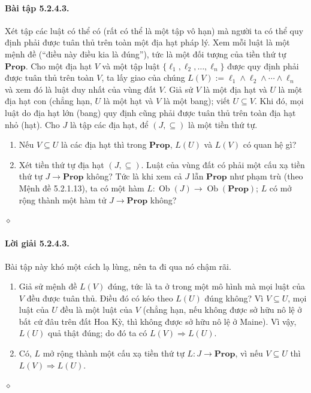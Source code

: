 \paragraph{Bài tập 5.2.4.3.} Xét tập các luật có thể có (rất có thể là một tập vô hạn) mà người ta có thể quy định phải được tuân thủ trên toàn một địa hạt pháp lý. Xem mỗi luật là một mệnh đề (``điều này điều kia là đúng''), tức là một đối tượng của tiền thứ tự $\mathbf{Prop}$. Cho một địa hạt $V$ và một tập luật $\{\ell_1,\ell_2,\ldots,\ell_n\}$ được quy định phải được tuân thủ trên toàn $V$, ta lấy giao của chúng $L(V):=\ell_1\wedge\ell_2\wedge\cdots\wedge\ell_n$ và xem đó là luật duy nhất của vùng đất $V$. Giả sử $V$ là một địa hạt và $U$ là một địa hạt con (chẳng hạn, $U$ là một hạt và $V$ là một bang); viết $U\subseteq V$. Khi đó, mọi luật do địa hạt lớn (bang) quy định cũng phải được tuân thủ trên toàn địa hạt nhỏ (hạt). Cho $J$ là tập các địa hạt, để $(J,\subseteq)$ là một tiền thứ tự.
\begin{enumerate}[label=\alph*.]
\item Nếu $V\subseteq U$ là các địa hạt thì trong $\mathbf{Prop}$, $L(U)$ và $L(V)$ có quan hệ gì?
\item Xét tiền thứ tự địa hạt $(J,\subseteq)$. Luật của vùng đất có phải một cấu xạ tiền thứ tự $J\to\mathbf{Prop}$ không? Tức là khi xem cả $J$ lẫn $\mathbf{Prop}$ như phạm trù (theo Mệnh đề 5.2.1.13), ta có một hàm $L:\operatorname{Ob}(J)\to\operatorname{Ob}(\mathbf{Prop})$; $L$ có mở rộng thành một hàm tử $J\to\mathbf{Prop}$ không?
\end{enumerate}\hfill$\diamond$
\paragraph{Lời giải 5.2.4.3.} Bài tập này khó một cách lạ lùng, nên ta đi qua nó chậm rãi.
\begin{enumerate}[label=\alph*.]
\item Giả sử mệnh đề $L(V)$ đúng, tức là ta ở trong một mô hình mà mọi luật của $V$ đều được tuân thủ. Điều đó có kéo theo $L(U)$ đúng không? Vì $V\subseteq U$, mọi luật của $U$ đều là một luật của $V$ (chẳng hạn, nếu không được sở hữu nô lệ ở bất cứ đâu trên đất Hoa Kỳ, thì không được sở hữu nô lệ ở Maine). Vì vậy, $L(U)$ quả thật đúng; do đó ta có $L(V)\Rightarrow L(U)$.
\item Có, $L$ mở rộng thành một cấu xạ tiền thứ tự $L:J\to\mathbf{Prop}$, vì nếu $V\subseteq U$ thì $L(V)\Rightarrow L(U)$.
\end{enumerate}\hfill$\diamond$
